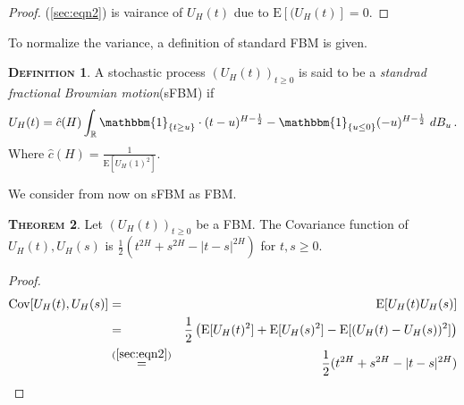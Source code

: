 \documentclass[a4paper, twoside, 11pt]{article}
\theoremstyle{definition}
\newtheorem{definition}{\scshape Definition}[section]
\newtheorem{theorem}[definition]{\scshape Theorem}
\newcommand{\brkt}[1]{\left({#1} \right)}
\begin{document}
\begin{proof}
  (\ref{sec:eqn2}) is vairance of $U_H(t)$ due to $\mathrm{E}[(U_H(t)] = 0$.
\end{proof}
To normalize the variance, a definition of standard FBM is given.

\begin{definition}
  A stochastic process $(U_H(t))_{t\ge 0}$ is said to be a \emph{standrad fractional Brownian motion}(sFBM) if
  \begin{equation}
U_H(t) = \hat{c}(H) \int_{\mathbb{R}} \mathbbm{1}_{\{t\ge u\}}\cdot (t-u)^{H-\frac{1}{2}} - \mathbbm{1}_{\{u\le 0\}} (-u)^{H-\frac{1}{2}} \, \mathop{dB_u}.
\label{sec:eqn3}
\end{equation}
Where $\hat{c}(H) = \frac{1}{\mathrm{E}[U_H(1)^2]} $.
\end{definition}
We consider from now on sFBM as FBM.

\begin{theorem}
 Let  $(U_H(t))_{t\ge 0}$ be a FBM. The Covariance function of $U_H(t), U_H(s)$ is $ \frac{1}{2}(t^{2H} + s^{2H} - |t-s|^{2H})$ for $t, s \ge 0$.
\end{theorem}

\begin{proof}
  \begin{eqnarray}
	\mathrm{Cov}[U_H(t), U_H(s)] &=& \mathrm{E}[U_H(t)U_H(s)] \nonumber\\
	&=& \frac{1}{2}\brkt{\mathrm{E}[U_H(t)^2] + \mathrm{E}[U_H(s)^2] - \mathrm{E}[(U_H(t) - U_H(s))^2]} \nonumber\\
	&\overset{(\ref{sec:eqn2})}{=}& \frac{1}{2}(t^{2H} + s^{2H} - |t-s|^{2H})
	\label{sec:eqn4}
  \end{eqnarray}
\end{proof}
\end{document}
